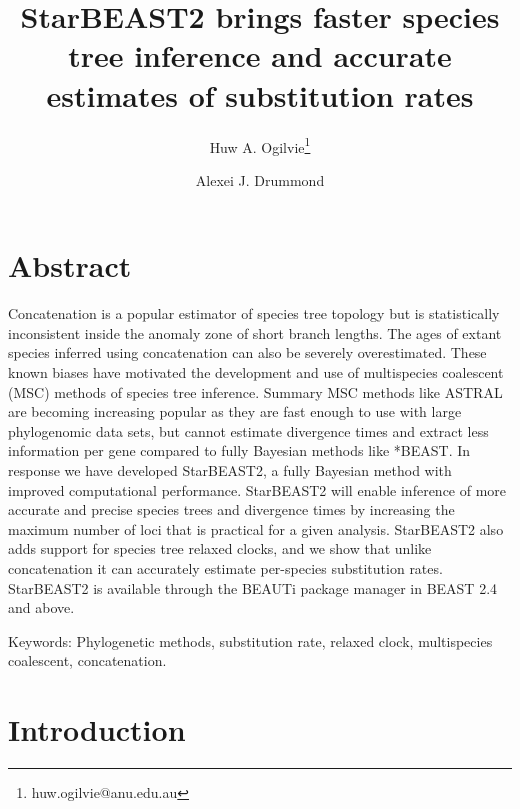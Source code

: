 \documentclass[12pt]{article}
\begin{document}
\title{StarBEAST2 brings faster species tree inference and accurate estimates of substitution rates}
\author[1,2]{Huw A. Ogilvie\thanks{huw.ogilvie@anu.edu.au}}
\author[2,3]{Alexei J. Drummond}

\maketitle

\clearpage

\justifying

\section*{Abstract}

Concatenation is a popular estimator of species tree topology but is
statistically inconsistent inside the anomaly zone of short branch lengths. The
ages of extant species inferred using concatenation can also be severely
overestimated. These known biases have motivated the development and use of
multispecies coalescent (MSC) methods of species tree inference. Summary MSC
methods like ASTRAL are becoming increasing popular as they are fast enough to
use with large phylogenomic data sets, but cannot estimate divergence times and
extract less information per gene compared to fully Bayesian methods like
*BEAST. In response we have developed StarBEAST2, a fully Bayesian method with
improved computational performance. StarBEAST2 will enable inference of more
accurate and precise species trees and divergence times by increasing the
maximum number of loci that is practical for a given analysis. StarBEAST2 also
adds support for species tree relaxed clocks, and we show that unlike
concatenation it can accurately estimate per-species substitution rates.
StarBEAST2 is available through the BEAUTi package manager in BEAST 2.4 and
above.

Keywords: Phylogenetic methods, substitution rate, relaxed clock, multispecies coalescent, concatenation.

\section*{Introduction}
\end{document}
